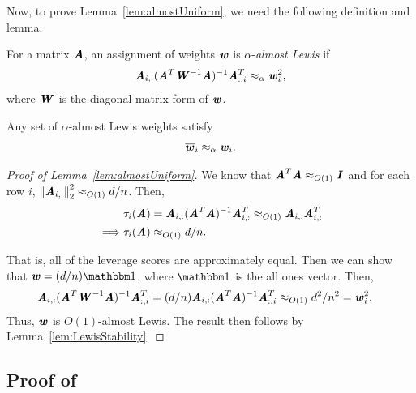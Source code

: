 Now, to prove Lemma~\ref{lem:almostUniform}, we need the following definition and lemma.

\begin{definition}
	For a matrix $\AA$, an assignment of weights $\ww$ is $\alpha$-\textit{almost Lewis} if
	\begin{align*}
	\AA_{i,:} (\AA^T \WW^{-1}\AA)^{-1} \AA_{:,i}^T \approx_\alpha \ww_i^2,
	\end{align*}
	where $\WW$ is the diagonal matrix form of $\ww$.
\end{definition}

\begin{lemma}\label{lem:LewisStability}
	Any set of $\alpha$-almost Lewis weights satisfy
	\begin{align*}
	\lw_i \approx_{\alpha} \ww_i.
	\end{align*}
\end{lemma}


\begin{proof}[Proof of Lemma~\ref{lem:almostUniform}]
We know that $\AA^T \AA \approx_{O(1)} \II$ and for each row $i$, $\norme{\AA_{i,:}}^2 \approx_{O(1)} d/n$. Then,
\begin{align*}
& \tau_i(\AA) = \AA_{i,:} (\AA^T \AA)^{-1} \AA_{i,:}^T \approx_{O(1)} \AA_{i,:} \AA_{i,:}^T\\
\implies & \tau_i(\AA) \approx_{O(1)} d/n.
\end{align*}

That is, all of the leverage scores are approximately equal. Then we can show that $\ww = (d/n)\ones$, where $\ones$ is the all ones vector. Then,
\begin{align*}
\AA_{i,:} (\AA^T \WW^{-1}\AA)^{-1} \AA_{:,i}^T &= (d/n)\AA_{i,:} (\AA^T  \AA)^{-1} \AA_{:,i}^T \approx_{O(1)} d^2/n^2 = \ww_i^2.
\end{align*}
Thus, $\ww$ is $O(1)$-almost Lewis. The result then follows by Lemma~\ref{lem:LewisStability}.
\end{proof}



\subsection{Proof of }\label{subsec:achievingSparsity}

